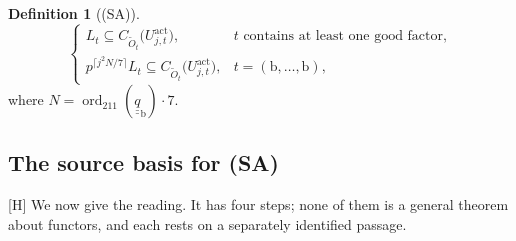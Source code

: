 \documentclass[11pt]{article}
\theoremstyle{plain}
\theoremstyle{definition}
\newtheorem{definition}[theorem]{Definition}
\newcommand{\SA}{\textup{(SA)}}
\newcommand{\ord}{\operatorname{ord}}
\begin{document}
\begin{definition}[\SA]\label{def:sa}
\[
\begin{cases}
 L_t\subseteq C_{\widetilde O_t}\bigl(U^{\mathrm{act}}_{j,t}\bigr),
   & \text{$t$ contains at least one good factor,}\\[2pt]
 p^{\lceil j^2N/7\rceil}L_t\subseteq C_{\widetilde O_t}\bigl(U^{\mathrm{act}}_{j,t}\bigr),
   & t=(\mathrm{b},\dots,\mathrm{b}),
\end{cases}
\]
where $N=\ord_{211}(\underline{\underline q}_{\mathrm{b}})\cdot 7$.
\end{definition}

\subsection{The source basis for \SA{}}\label{sec:sabasis}

[H] We now give the reading.  It has four steps; none of them is a general
theorem about functors, and each rests on a separately identified passage.
\end{document}
